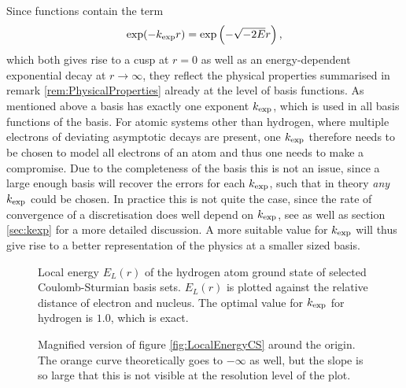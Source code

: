 \pagebreak
\noindent
Since \CS functions contain the term
\[ \exp(-k_\text{exp} r) = \exp\left( - \sqrt{-2E}r \right), \]
which both gives rise to a cusp at $r=0$ as well as
an energy-dependent exponential decay at $r\to\infty$,
they reflect the physical properties summarised in remark \vref{rem:PhysicalProperties}
already at the level of basis functions.
As mentioned above a \CS basis has exactly one exponent $k_\text{exp}$,
which is used in all basis functions of the \CS basis.
For atomic systems other than hydrogen,
where multiple electrons of deviating asymptotic decays are present,
one $k_\text{exp}$ therefore needs to be chosen to model all electrons of an atom
and thus one needs to make a compromise.
Due to the completeness of the \CS basis
this is not an issue, since a large enough basis will recover the errors
for each $k_\text{exp}$, such that in theory \emph{any} $k_\text{exp}$ could be chosen.
In practice this is not quite the case,
since the rate of convergence of a \CS discretisation
does well depend on $k_\text{exp}$,
see \cite{Avery2017} as well as section \vref{sec:kexp} for a more detailed discussion.
A more suitable value for $k_\text{exp}$ will thus give rise
to a better representation of the physics at a smaller sized \CS basis.
%
\begin{figure}[p]
	\centering
	\caption[Local energy of the hydrogen ground state for {\CS} bases]{
		Local energy $E_L(r)$ of the hydrogen atom ground state
		of selected Coulomb-Sturmian basis sets.
		$E_L(r)$ is plotted against the relative distance
		of electron and nucleus.
		The optimal value for $k_\text{exp}$ for hydrogen is $1.0$,
		which is exact.
	}
	\label{fig:LocalEnergyCS}
\end{figure}
%
\begin{figure}[p]
	\centering
	\caption[Local energy of the hydrogen ground state for {\CS} bases (magnified)]{
		Magnified version of figure \vref{fig:LocalEnergyCS}
		around the origin.
		The orange curve theoretically goes to $-\infty$ as well,
		but the slope is so large that this is not visible
		at the resolution level of the plot.
	}
	\label{fig:LocalEnergyCSZoom}
\end{figure}

